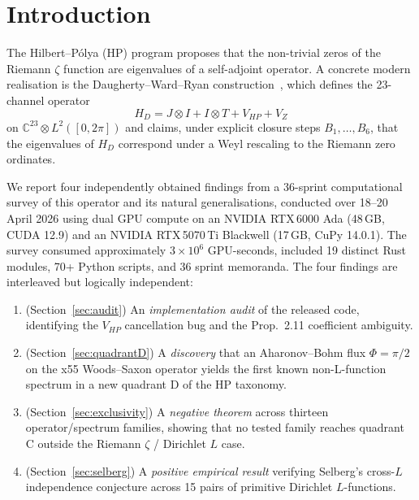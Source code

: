 \documentclass[11pt,a4paper]{article}
\begin{document}
\begin{abstract}
These four results together establish that: the published
Reeds-Hilbert-P\'olya operator requires correction; the natural
Schr\"odinger-level construction space yields (at best) a new
quadrant~D that still fails prime-triad concentration; no single
operator from any of thirteen tested families reaches the
Riemann-zero quadrant~C; and combining $L$-functions does not build
up to quadrant~C. We conclude that the Hilbert--P\'olya operator, if
it exists, must arise from a structure qualitatively different from
the natural spectral constructions explored here.
\end{abstract}

\tableofcontents

\section{Introduction}\label{sec:intro}

The Hilbert--P\'olya (HP) program proposes that the non-trivial zeros
of the Riemann $\zeta$ function are eigenvalues of a self-adjoint
operator. A concrete modern realisation is the Daugherty--Ward--Ryan
construction~\cite{daugherty2026}, which defines the 23-channel
operator
\begin{equation}
  H_D = J \otimes I + I \otimes T + V_{HP} + V_Z
\end{equation}
on $\mathbb{C}^{23}\otimes L^2([0,2\pi])$ and claims, under explicit
closure steps $B_1,\ldots,B_6$, that the eigenvalues of $H_D$ correspond
under a Weyl rescaling to the Riemann zero ordinates.

We report four independently obtained findings from a 36-sprint
computational survey of this operator and its natural generalisations,
conducted over 18--20 April 2026 using dual GPU compute on an NVIDIA
RTX\,6000 Ada (48\,GB, CUDA 12.9) and an NVIDIA RTX\,5070\,Ti Blackwell
(17\,GB, CuPy 14.0.1). The survey consumed approximately
$3\times 10^6$ GPU-seconds, included 19 distinct Rust modules, 70+
Python scripts, and 36 sprint memoranda. The four findings are
interleaved but logically independent:

\begin{enumerate}[nosep]
\item (Section~\ref{sec:audit}) An \emph{implementation audit} of the
      released code, identifying the $V_{HP}$ cancellation bug and
      the Prop.~2.11 coefficient ambiguity.
\item (Section~\ref{sec:quadrantD}) A \emph{discovery} that an
      Aharonov--Bohm flux $\Phi=\pi/2$ on the x55 Woods--Saxon operator
      yields the first known non-L-function spectrum in a new quadrant
      D of the HP taxonomy.
\item (Section~\ref{sec:exclusivity}) A \emph{negative
      theorem} across thirteen operator/spectrum families, showing
      that no tested family reaches quadrant C outside the Riemann
      $\zeta$ / Dirichlet $L$ case.
\item (Section~\ref{sec:selberg}) A \emph{positive empirical result}
      verifying Selberg's cross-$L$ independence conjecture across
      15 pairs of primitive Dirichlet $L$-functions.
\end{enumerate}
\end{document}
